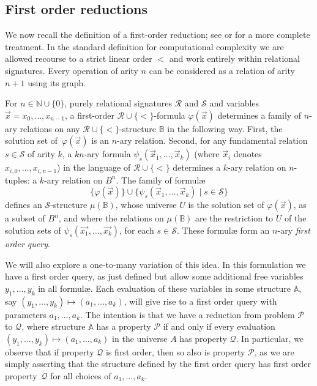 \documentclass[reqno]{amsart}
\theoremstyle{plain}
\theoremstyle{definition}
\begin{document}
\subsection{First order reductions}
We now recall the definition of a first-order reduction; see \cite{imm} or \cite{lib} for a more complete treatment.  In the standard definition for computational complexity we are allowed recourse to a strict linear order $<$ and work entirely within relational signatures.  Every operation of arity $n$ can be considered as a relation of arity $n+1$ using its graph.

For $n\in {\mathbb N}\cup\{0\}$, purely relational signatures $\mathcal R$ and $\mathcal S$ and variables $\vec{x}=x_0,\dots, x_{n-1}$, a first-order ${\mathcal R \cup \{<\}}$-formula $\varphi(\vec{x})$ determines a 
family of $n$-ary relations on any ${\mathcal R \cup \{<\}}$-structure $\mathbb B$ in the following way. First, the solution set of~$\varphi(\vec{x})$ is an $n$-ary relation.  Second, for any
fundamental relation $s\in \mathcal S$ of arity $k$, a $kn$-ary formula  $\psi_s(\vec{x}_1,\dots,\vec{x}_k)$
(where $\vec{x}_i$ denotes $x_{i,0}, \dots , x_{i,n-1}$) in the language of ${\mathcal R \cup \{<\}}$ determines a $k$-ary relation on $n$-tuples: a $k$-ary relation on $B^n$. 
The family of formul{\ae}
\[
\{\varphi(\vec{x})\}\cup\{\psi_s(\vec{x}_1,\dots,\vec{x}_k)\mid s\in\mathcal S\}
\]
defines an ${\mathcal S}$-structure $\mu(\mathbb B)$, whose universe $U$ is the solution set of $\varphi(\vec{x})$, as a subset of $B^n$, and where the relations on $\mu(\mathbb B)$ are the restriction to $U$ of the solution sets of $\psi_{s}(\vec{x_1},\dots,\vec{x_k})$, for each $s\in\mathcal S$. These formul{\ae} form an $n$-ary \emph{first order query}.

We will also explore a one-to-many variation of this idea.  In this formulation we have a first order query, as just defined but allow some additional free variables $y_1,\dots,y_k$ in all formul{\ae}.  Each evaluation of these variables in some structure $\mathbb{A}$, say $(y_1,\dots,y_k)\mapsto(a_1,\dots,a_k)$, will give rise to a first order query with parameters $a_1,\dots,a_k$.  The intention is that we have a reduction from problem $\mathcal{P}$ to $\mathcal{Q}$, where structure $\mathbb{A}$ has a  property $\mathcal{P}$ if and only if  every evaluation $(y_1,\dots,y_k)\mapsto (a_1,\dots,a_k)$ in the universe $A$ has property $\mathcal{Q}$.  In particular, we observe that if property $\mathcal{Q}$ is first order, then so also is property $\mathcal{P}$, as we are simply asserting that the structure defined by the first order query has first order property~$\mathcal{Q}$ for all choices of $a_1,\dots,a_k$.
\end{document}
